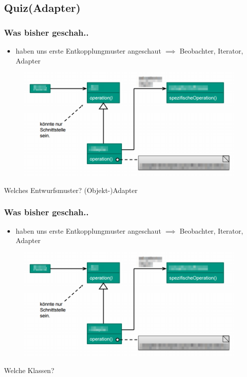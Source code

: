 \documentclass[18pt]{beamer}
\begin{document}
	\subsection{Quiz(Adapter)}
	\begin{frame}
		\frametitle{Was bisher geschah..}
		\begin{itemize}
			\item haben uns erste Entkopplungmuster angeschaut \pause
			\linebreak $\implies$ Beobachter, Iterator, Adapter \pause
		\end{itemize}
		\begin{figure}
			\includegraphics[scale=0.33]{./pics/tut4/adap-obj-mod.png}
		\end{figure}
		Welches Entwurfsmuster? \pause (Objekt-)Adapter
	\end{frame}
	
	\begin{frame}
		\frametitle{Was bisher geschah..}
		\begin{itemize}
			\item haben uns erste Entkopplungmuster angeschaut
			\linebreak $\implies$ Beobachter, Iterator, Adapter
		\end{itemize}
		\begin{figure}
			\includegraphics[scale=0.33]{./pics/tut4/adap-obj-mod.png}
		\end{figure}
		Welche Klassen?
	\end{frame}
	
\end{document}
